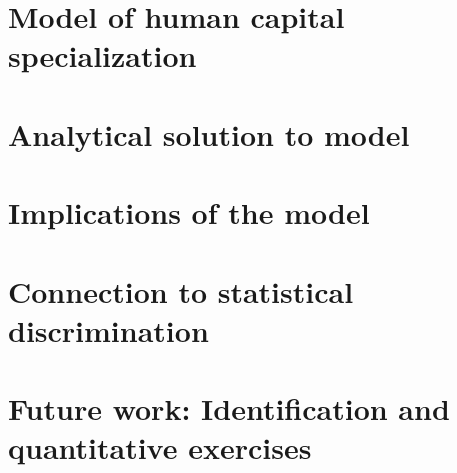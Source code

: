 \documentclass[11 pt]{article}
\begin{document}


\section{Model of human capital specialization}\label{sec:model}



\section{Analytical solution to model}\label{sec:analytic_results}




\section{Implications of the model}\label{sec:sims}



\section{Connection to statistical discrimination}\label{sec:stat_discrim}



\section{Future work: Identification and quantitative exercises}\label{sec:future_work}
\end{document}
